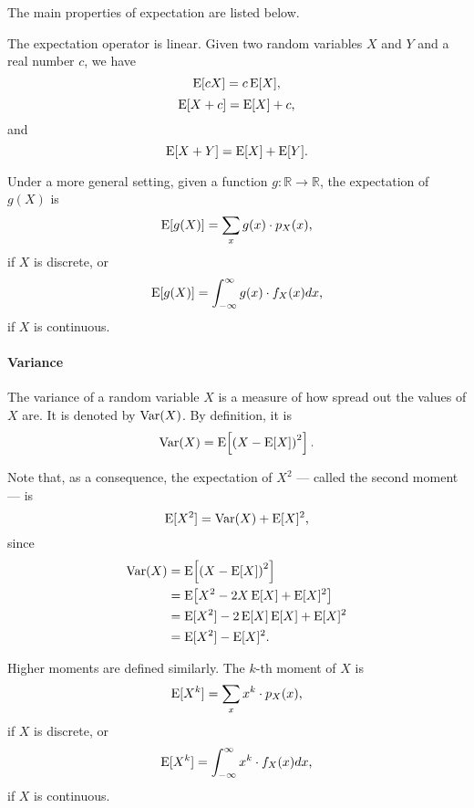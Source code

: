 The main properties of expectation are listed below.

The expectation operator is linear.  Given two random variables $X$ and $Y$ and a real
number $c$, we have
\begin{equation*}
  \operatorname{E}[c X] = c \operatorname{E}[X]\text{,}
\end{equation*}
\begin{equation*}
  \operatorname{E}[X + c] = \operatorname{E}[X] + c\text{,}
\end{equation*}
and
\begin{equation*}
  \operatorname{E}[X + Y] = \operatorname{E}[X] + \operatorname{E}[Y]\text{.}
\end{equation*}

Under a more general setting, given a function $g : \mathbb{R} \rightarrow \mathbb{R}$,
the expectation of $g(X)$ is
\begin{equation*}
  \operatorname{E}[g(X)] = \sum_{x} g(x) \cdot p_X(x)\text{,}
\end{equation*}
if $X$ is discrete, or
\begin{equation*}
  \operatorname{E}[g(X)] = \int_{-\infty}^{\infty} g(x) \cdot f_X(x) dx\text{,}
\end{equation*}
if $X$ is continuous.

\paragraph{Variance}  The variance of a random variable $X$ is a measure of how
spread out the values of $X$ are.  It is denoted by $\operatorname{Var}(X)$.  By definition, it is
\begin{equation}
  \label{eq:variance}
  \operatorname{Var}(X) = \operatorname{E}\!\left[\left(X - \operatorname{E}[X]\right)^2\right]\text{.}
\end{equation}

Note that, as a consequence, the expectation of $X^2$ --- called the second moment --- is
\[
  \operatorname{E}[X^2] = \operatorname{Var}(X) + \operatorname{E}[X]^2\text{,}
\]
since
\begin{align*}
  \operatorname{Var}(X)
    &= \operatorname{E}\!\left[\left(X - \operatorname{E}[X]\right)^2\right] \\
    &= \operatorname{E}\!\left[X^2 - 2 X \operatorname{E}[X] + \operatorname{E}[X]^2\right] \\
    &= \operatorname{E}[X^2] - 2 \operatorname{E}[X] \operatorname{E}[X] + \operatorname{E}[X]^2 \\
    &= \operatorname{E}[X^2] - \operatorname{E}[X]^2\text{.}
\end{align*}

Higher moments are defined similarly.  The $k$-th moment of $X$ is
\begin{equation*}
  \operatorname{E}[X^k] = \sum_{x} x^k \cdot p_X(x)\text{,}
\end{equation*}
if $X$ is discrete, or
\begin{equation*}
  \operatorname{E}[X^k] = \int_{-\infty}^{\infty} x^k \cdot f_X(x) dx\text{,}
\end{equation*}
if $X$ is continuous.

